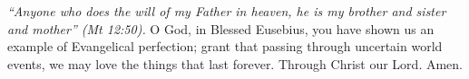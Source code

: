 \pagestyle{empty}
\hspace{0pt}
\vfill

\textit{``Anyone who does the will of my Father in heaven, he is
my brother and sister and mother'' (Mt 12:50).}
\medbreak
O God, in Blessed Eusebius, you have shown us an example of Evangelical perfection; grant that passing through
uncertain world events, we may love the things that last forever.
Through Christ our Lord. Amen.
\vfill
\hspace{0pt}
\newpage
